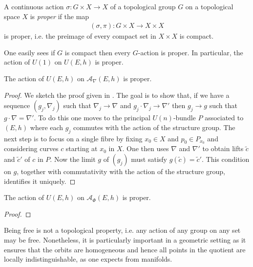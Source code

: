 \documentclass[12pt]{ociamthesis}  %
\begin{document}
\begin{definition}
  A continuous action $\sigma : G\times X\to X$ of a topological group $G$
  on a topological space $X$ is \emph{proper} if the map
  \begin{align}\label{eq:proper_map}
    (\sigma,\pi) : G\times X \to X\times X
  \end{align}
  is proper, i.e. the preimage of every compact set in $X\times X$
  is compact.
\end{definition}

\begin{example}
  One easily sees if $G$ is compact then every $G$-action is proper.
  In particular, the action of $U(1)$ on $U(E,h)$ is
  proper.
\end{example}

\begin{example}\label{ex:h_proper_action}
  The action of $U(E,h)$ on $\mathcal A_\nabla(E,h)$ is proper.
  \begin{proof}
    We sketch the proof given in
    \cite[{Proposition 7.1.14}]{kobayashi1987}.
    The goal is to show that, if we have a sequence $(g_j,\nabla_j)$
    such that $\nabla_j\to\nabla$ and $g_j\cdot\nabla_j\to\nabla'$
    then $g_j\to g$ such that $g\cdot\nabla = \nabla'$. To do this
    one moves to the principal $U(n)$-bundle $P$ associated to $(E,h)$
    where each $g_j$ commutes with the action of the structure
    group. The next step is to focus on a single fibre by fixing $x_0\in X$ and
    $p_0\in P_{x_0}$ and considering curves $c$ starting at $x_0$ in $X$.
    One then uses $\nabla$ and $\nabla'$ to obtain lifts $\tilde c$ and
    $\tilde c'$ of $c$ in $P$. Now the limit $g$ of $(g_j)$ must satisfy
    $g(\tilde c) = \tilde c'$. This condition on $g$, together with
    commutativity with the action of the structure group, identifies it
    uniquely.
  \end{proof}
\end{example}

\begin{example}\label{ex:higgs_proper_action}
  The action of $U(E,h)$ on $\mathcal A_\Phi (E,h)$ is proper.
  \begin{proof}
    \missingproof
  \end{proof}
\end{example}

Being free is not a topological property, i.e. any action of any group on any
set may be free. Nonetheless, it is particularly important in a geometric
setting as it ensures that the orbits are homogeneous and hence all points in
the quotient are locally indistinguishable, as one expects from manifolds.
\end{document}
